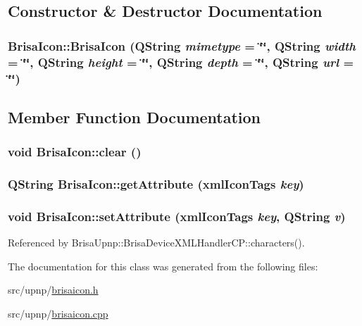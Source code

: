 \subsection{Constructor \& Destructor Documentation}
\hypertarget{classBrisaUpnp_1_1BrisaIcon_a5ef224341789110c21dac95f2cffdcbf}{
\subsubsection[{BrisaIcon}]{\setlength{\rightskip}{0pt plus 5cm}BrisaIcon::BrisaIcon (QString {\em mimetype} = {\ttfamily \char`\"{}\char`\"{}}, \/  QString {\em width} = {\ttfamily \char`\"{}\char`\"{}}, \/  QString {\em height} = {\ttfamily \char`\"{}\char`\"{}}, \/  QString {\em depth} = {\ttfamily \char`\"{}\char`\"{}}, \/  QString {\em url} = {\ttfamily \char`\"{}\char`\"{}})}}
\label{classBrisaUpnp_1_1BrisaIcon_a5ef224341789110c21dac95f2cffdcbf}


\subsection{Member Function Documentation}
\hypertarget{classBrisaUpnp_1_1BrisaIcon_af9af1189c483e43bc12636e13ac28cec}{
\subsubsection[{clear}]{\setlength{\rightskip}{0pt plus 5cm}void BrisaIcon::clear ()}}
\label{classBrisaUpnp_1_1BrisaIcon_af9af1189c483e43bc12636e13ac28cec}
\hypertarget{classBrisaUpnp_1_1BrisaIcon_a8aceaa9001dcabdd740f3442f3a262de}{
\subsubsection[{getAttribute}]{\setlength{\rightskip}{0pt plus 5cm}QString BrisaIcon::getAttribute ({\bf xmlIconTags} {\em key})}}
\label{classBrisaUpnp_1_1BrisaIcon_a8aceaa9001dcabdd740f3442f3a262de}
\hypertarget{classBrisaUpnp_1_1BrisaIcon_a80c1dbe94bb9934d9d1114571f9b3579}{
\subsubsection[{setAttribute}]{\setlength{\rightskip}{0pt plus 5cm}void BrisaIcon::setAttribute ({\bf xmlIconTags} {\em key}, \/  QString {\em v})}}
\label{classBrisaUpnp_1_1BrisaIcon_a80c1dbe94bb9934d9d1114571f9b3579}


Referenced by BrisaUpnp::BrisaDeviceXMLHandlerCP::characters().

The documentation for this class was generated from the following files:\begin{DoxyCompactItemize}
\item 
src/upnp/\hyperlink{brisaicon_8h}{brisaicon.h}\item 
src/upnp/\hyperlink{brisaicon_8cpp}{brisaicon.cpp}\end{DoxyCompactItemize}
